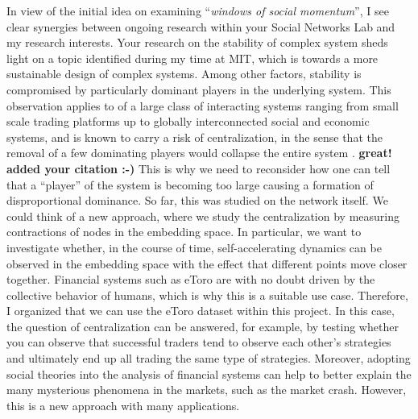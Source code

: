
In view of the initial idea on examining ``\textit{windows of social momentum}'', I see clear synergies between ongoing research within your Social Networks Lab and my research interests. 
Your research on the stability of complex system sheds light on a topic identified during my time at MIT, which is towards a more sustainable design of complex systems.
Among other factors, stability is compromised by particularly dominant players in the underlying system.
This observation applies to of a large class of interacting systems ranging from small scale trading platforms up to globally interconnected social and economic systems, and is known to carry a risk of centralization, in the sense that the removal of a few dominating players would collapse the entire system \cite{lera2017prediction}. \textbf{great! added your citation :-)}
This is why we need to reconsider how one can tell that a ``player'' of the system is becoming too large causing a formation of disproportional dominance. 
So far, this was studied on the network itself. 
We could think of a new approach, where we study the centralization by measuring contractions of nodes in the embedding space.
In particular, we want to investigate whether, in the course of time, self-accelerating dynamics can be observed in the embedding space with the effect that different points move closer together.
Financial systems such as eToro are with no doubt driven by the collective behavior of humans, which is why this is a suitable use case.
Therefore, I organized that we can use the eToro dataset within this project.  
In this case, the question of centralization can be answered, for example, by testing whether you can observe that successful traders tend to observe each other's strategies and ultimately end up all trading the same type of strategies.
Moreover, adopting social theories into the analysis of financial systems can help to better explain the many mysterious phenomena in the markets, such as the market crash. 
However, this is a new approach with many applications.\\


